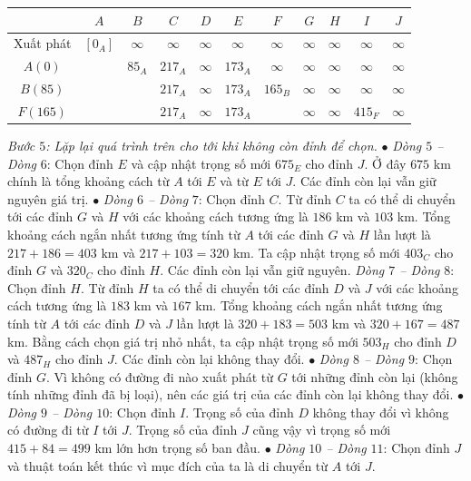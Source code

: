 \begin{multicols}{2}
\begin{table}[H]
{\begin{tabular}{|c|c|c|c|c|c|c|c|c|c|c|}
			&$A$&	$B$&	$C$&	$D$&	$E$&	$F$&	$G$&	$H$&	$I$&	$J$\\
			\hline
			Xuất phát&	$[0_A ]$	&$\infty$&	$\infty$&	$\infty$	&$\infty$	&$\infty$&	$\infty$&	$\infty$&	$\infty$	&$\infty$\\
			\hline
			$A(0)$&		&$85_A$	&$217_A$&	$\infty$	&$173_A$&	$\infty$&	$\infty$&	$\infty$&	$\infty$&	$\infty$\\
			\hline
			$B(85)$	&	&	&$217_A$&	$\infty$&	$173_A$&	$165_B$&	$\infty$	&$\infty$&	$\infty$	&$\infty$\\
			\hline
			$F(165)$&	&	&	$217_A$&	$\infty$	&$173_A$	&	&$\infty$&	$\infty$&	$415_F$	&$\infty$\\
			\hline
		\end{tabular}}
		\vspace*{-10pt}
	\end{table}
	\textit{Bước $5$: Lặp lại quá trình trên cho tới khi không còn đỉnh để chọn.}
	\vskip 0.1cm 
	$\bullet$ \textit{Dòng $5$ -- Dòng} $6$: Chọn đỉnh $E$ và cập nhật trọng số mới $675_E$ cho đỉnh $J$. Ở đây $675$ km chính là tổng khoảng cách từ $A$ tới $E$ và từ $E$ tới $J$. Các đỉnh còn lại vẫn giữ nguyên giá trị.
	\vskip 0.1cm 
	$\bullet$ \textit{Dòng $6$ -- Dòng} $7$: Chọn đỉnh $C$. Từ đỉnh $C$ ta có thể di chuyển tới các đỉnh $G$ và $H$ với các khoảng cách tương ứng là $186$ km và $103$ km. Tổng khoảng cách ngắn nhất tương ứng tính từ $A$ tới các đỉnh $G$ và $H$ lần lượt là $217+186=403$ km và $217+103=320$ km. Ta cập nhật trọng số mới $403_C$ cho đỉnh $G$ và $320_C$ cho đỉnh $H$. Các đỉnh còn lại vẫn giữ nguyên. 
	\vskip 0.1cm
	\textit{Dòng  $7$ -- Dòng} $8$: Chọn đỉnh $H$. Từ đỉnh $H$ ta có thể di chuyển tới các đỉnh $D$ và $J$ với các khoảng cách tương ứng là $183$ km và $167$ km. Tổng khoảng cách ngắn nhất tương ứng tính từ $A$ tới các đỉnh $D$ và $J$ lần lượt là $320+183=503$ km và $320+167=487$ km. Bằng cách chọn giá trị nhỏ nhất, ta cập nhật trọng số mới $503_H$ cho đỉnh $D$ và $487_H$ cho đỉnh $J$. Các đỉnh còn lại không thay đổi. 
	\vskip 0.1cm
	$\bullet$ \textit{Dòng  $8$ -- Dòng $9$}: Chọn đỉnh $G$. Vì không có đường đi nào xuất phát từ $G$ tới những đỉnh còn lại (không tính những đỉnh đã bị loại), nên các giá trị của các đỉnh còn lại không thay đổi.
	\vskip 0.1cm
	$\bullet$ \textit{Dòng  $9$ -- Dòng $10$}: Chọn đỉnh $I$. Trọng số của đỉnh $D$ không thay đổi vì không có đường đi từ $I$ tới $J$. Trọng số của đỉnh $J$ cũng vậy vì trọng số mới $415+84=499$ km lớn hơn trọng số ban đầu. 
	\vskip 0.1cm
	$\bullet$ \textit{Dòng  $10$ -- Dòng $11$}: Chọn đỉnh $J$ và thuật toán kết thúc vì mục đích của ta là di chuyển từ $A$ tới $J$.

\end{multicols}
